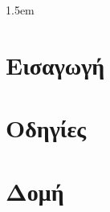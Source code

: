 \documentclass[12pt]{book}
\begin{document}
\emergencystretch 1.5em
\hfuzz 0.3pt
\vfuzz \hfuzz
\raggedbottom
\linespread{1.25}


\begingroup






\endgroup 


\frontmatter



\tableofcontents
\listoffigures
\listoftables


\mainmatter

\chapter*{Εισαγωγή}
\label{Introduction}

\cleardoublepage

\pagestyle{fancy}
\fancyhead{}
\renewcommand{\chaptermark}[1]{\markboth{#1}{#1}}
\fancyhead[RO]{}
\fancyhead[LE]{\chaptername\ \thechapter\ --\ \leftmark}
\setlength\headheight{28pt}


\chapter{Οδηγίες}
\label{Chapter 1}


\chapter{Δομή}
\label{Chapter 2}

\end{document}
